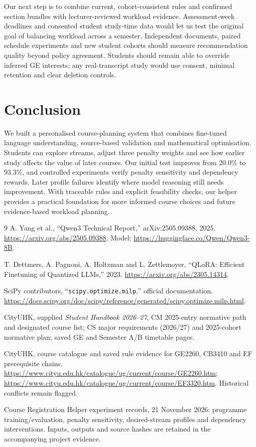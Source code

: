 \documentclass{article}
\begin{document}
Our next step is to combine current, cohort-consistent rules and confirmed section bundles with lecturer-reviewed workload evidence. Assessment-week deadlines and consented student study-time data would let us test the original goal of balancing workload across a semester. Independent documents, paired schedule experiments and new student cohorts should measure recommendation quality beyond policy agreement. Students should remain able to override inferred GE interests; any real-transcript study would use consent, minimal retention and clear deletion controls.

\section{Conclusion}
We built a personalised course-planning system that combines fine-tuned language understanding, source-based validation and mathematical optimisation. Students can explore streams, adjust three penalty weights and see how earlier study affects the value of later courses. Our initial test improves from 20.0\% to 93.3\%, and controlled experiments verify penalty sensitivity and dependency rewards. Later profile failures identify where model reasoning still needs improvement. With traceable rules and explicit feasibility checks, our helper provides a practical foundation for more informed course choices and future evidence-based workload planning.

\begin{thebibliography}{9}
\small
{}
A. Yang et al., ``Qwen3 Technical Report,'' arXiv:2505.09388, 2025.
\url{https://arxiv.org/abs/2505.09388}. Model: \url{https://huggingface.co/Qwen/Qwen3-8B}.

T. Dettmers, A. Pagnoni, A. Holtzman and L. Zettlemoyer, ``QLoRA: Efficient Finetuning of Quantized LLMs,'' 2023. \url{https://arxiv.org/abs/2305.14314}.

SciPy contributors, ``\texttt{scipy.optimize.milp},'' official documentation.
\url{https://docs.scipy.org/doc/scipy/reference/generated/scipy.optimize.milp.html}.

CityUHK, supplied \emph{Student Handbook 2026--27}, CM 2025-entry normative path and designated course list; CS major requirements (2026/27) and 2025-cohort normative plan; saved GE and Semester A/B timetable pages.

CityUHK, course catalogue and saved rule evidence for GE2260, CB3410 and EF prerequisite chains. \url{https://www.cityu.edu.hk/catalogue/ug/current/course/GE2260.htm}; \url{https://www.cityu.edu.hk/catalogue/ug/current/course/EF3320.htm}. Historical conflicts remain flagged.

Course Registration Helper experiment records, 21 November 2026: programme training/evaluation, penalty sensitivity, desired-stream profiles and dependency interventions. Inputs, outputs and source hashes are retained in the accompanying project evidence.
\end{thebibliography}
\end{document}
